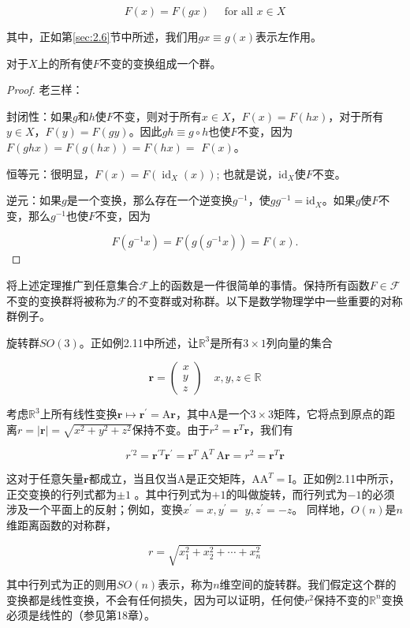 $$
F(x)=F(g x) \quad \text { for all } x \in X
$$

其中，正如第\ref{sec:2.6}节中所述，我们用$g x \equiv g(x)$表示左作用。
\begin{theorem}
    对于$X$上的所有使$F$不变的变换组成一个群。
\end{theorem}
\begin{proof}
    老三样：

封闭性：如果$g$和$h$使$F$不变，则对于所有$x \in X$，$F(x)=F(h x)$，对于所有$y \in X$，$F(y)=F(g y)$。因此$g h \equiv g \circ h$也使$F$不变，因为$F(g h x)=F(g(h x))=F(h x)=$ $F(x)$。

恒等元：很明显，$F(x)=F\left(\operatorname{id}_{X}(x)\right)$; 也就是说，$\mathrm{id}_{X}$使$F$不变。

逆元：如果$g$是一个变换，那么存在一个逆变换$g^{-1}$，使$g g^{-1}=\mathrm{id}_{X}$。如果$g$使$F$不变，那么$g^{-1}$也使$F$不变，因为

$$
F\left(g^{-1} x\right)=F\left(g\left(g^{-1} x\right)\right)=F(x) .
$$
\end{proof}
将上述定理推广到任意集合$\mathcal{F}$上的函数是一件很简单的事情。保持所有函数$F \in \mathcal{F}$不变的变换群将被称为$\mathcal{F}$的不变群或对称群。以下是数学物理学中一些重要的对称群例子。
\begin{eg}
    旋转群$SO(3)$。正如例2.11中所述，让$\mathbb{R}^3$是所有$3 \times 1$列向量的集合

$$
\mathbf{r}=\left(\begin{array}{l}
x \\
y \\
z
\end{array}\right) \quad  x, y, z \in \mathbb{R}
$$

考虑$\mathbb{R}^3$上所有线性变换$\mathbf{r} \mapsto \mathbf{r}^{\prime}=\mathrm{A} \mathbf{r}$，其中$\mathrm{A}$是一个$3 \times 3$矩阵，它将点到原点的距离$r=|\mathbf{r}|=\sqrt{x^{2}+y^{2}+z^{2}}$保持不变。由于$r^2=\mathbf{r}^T \mathbf{r}$，我们有

$$
r^{\prime 2}=\mathbf{r}^{\prime T} \mathbf{r}^{\prime}=\mathbf{r}^{T} \mathrm{~A}^{T} \mathrm{~A} \mathbf{r}=r^{2}=\mathbf{r}^{T} \mathbf{r}
$$

这对于任意矢量$\mathbf{r}$都成立，当且仅当$\mathrm{A}$是正交矩阵，$\mathrm{AA}^{T}=\mathrm{I}$。正如例2.11中所示，正交变换的行列式都为$\pm 1$ 。其中行列式为$+1$的叫做旋转，而行列式为$-1$的必须涉及一个平面上的反射；例如，变换$x^{\prime}=x, y^{\prime}=$ $y, z^{\prime}=-z$。
同样地，$O(n)$是$n$维距离函数的对称群，

$$
r=\sqrt{x_{1}^{2}+x_{2}^{2}+\cdots+x_{n}^{2}}
$$

其中行列式为正的则用$S O(n)$表示，称为$n$维空间的旋转群。我们假定这个群的变换都是线性变换，不会有任何损失，因为可以证明，任何使$r^{2}$保持不变的$\mathbb{R}^{n}$变换必须是线性的（参见第18章）。
\end{eg}

